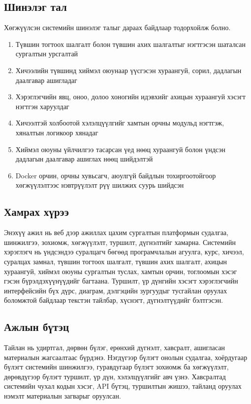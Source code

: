 \subsection*{Шинэлэг тал}
Хөгжүүлсэн системийн шинэлэг талыг дараах байдлаар тодорхойлж болно.
\begin{enumerate}[nosep]
\item Түвшин тогтоох шалгалт болон түвшин ахих шалгалтыг нэгтгэсэн шаталсан сургалтын урсгалтай
\item Хичээлийн түвшинд хиймэл оюунаар үүсгэсэн хураангуй, сорил, дадлагын даалгавар ашигладаг
\item Хэрэглэгчийн явц, оноо, долоо хоногийн идэвхийг ахицын хураангуй хэсэгт нэгтгэн харуулдаг
\item Хичээлтэй холбоотой хэлэлцүүлгийг хамтын орчны модульд нэгтгэж, хяналтын логикоор хянадаг
\item Хиймэл оюуны үйлчилгээ тасарсан үед нөөц хураангуй болон үндсэн дадлагын даалгавар ашиглах нөөц шийдэлтэй
\item Docker орчин, орчны хувьсагч, аюулгүй байдлын тохиргоотойгоор хөгжүүлэлтээс нэвтрүүлэлт рүү шилжих суурь шийдсэн
\end{enumerate}

\subsection*{Хамрах хүрээ}
Энэхүү ажил нь веб дээр ажиллах цахим сургалтын платформын судалгаа, шинжилгээ, зохиомж, хөгжүүлэлт, туршилт, дүгнэлтийг хамарна. Системийн хэрэглэгч нь үндсэндээ суралцагч бөгөөд програмчлалын агуулга, курс, хичээл, суралцах замнал, түвшин тогтоох шалгалт, түвшин ахих шалгалт, ахицын хураангуй, хиймэл оюуны сургалтын туслах, хамтын орчин, тоглоомын хэсэг гэсэн бүрэлдэхүүнүүдийг багтаана. Туршилт, үр дүнгийн хэсэгт хэрэглэгчийн интерфейсийн бүх дүрс, диаграм, дэлгэцийн зургуудыг тусгайлан оруулах боломжтой байдлаар текстэн тайлбар, хүснэгт, дүгнэлтүүдийг бэлтгэсэн.

\subsection*{Ажлын бүтэц}
Тайлан нь удиртгал, дөрвөн бүлэг, ерөнхий дүгнэлт, хавсралт, ашигласан материалын жагсаалтаас бүрдэнэ. Нэгдүгээр бүлэгт онолын судалгаа, хоёрдугаар бүлэгт системийн шинжилгээ, гуравдугаар бүлэгт зохиомж ба хөгжүүлэлт, дөрөвдүгээр бүлэгт туршилт, үр дүн, хэлэлцүүлгийг авч үзнэ. Хавсралтад системийн чухал кодын хэсэг, API бүтэц, туршилтын жишээ, тайланд оруулах нэмэлт материалын загварыг оруулсан.
